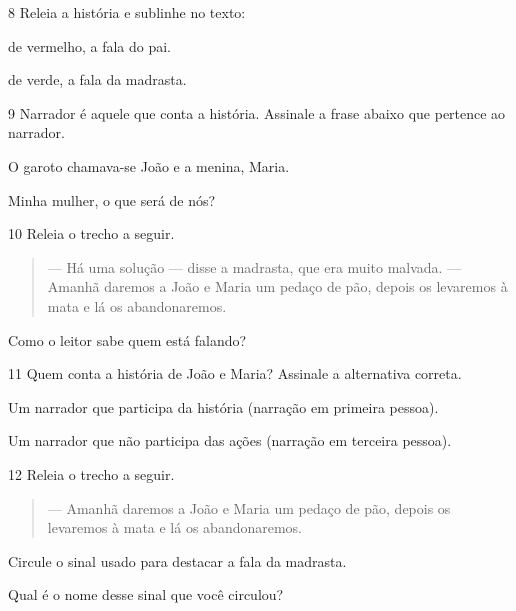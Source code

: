 \num{8} Releia a história e sublinhe no texto:

\begin{escolha}
\item de vermelho, a fala do pai.

\item de verde, a fala da madrasta.
\end{escolha}

\num{9} Narrador é aquele que conta a história. Assinale a frase abaixo que
pertence ao narrador.

\begin{escolha}
\boxitem[X] O garoto chamava-se João e a menina, Maria.

\boxitem[] Minha mulher, o que será de nós?
\end{escolha}

\num{10} Releia o trecho a seguir.

\begin{quote}
--- Há uma solução --- disse a madrasta, que era muito malvada.
--- Amanhã daremos a João e Maria um pedaço de pão, depois os levaremos
à mata e lá os abandonaremos.
\end{quote}

Como o leitor sabe quem está falando?


\num{11} Quem conta a história de João e Maria? Assinale a alternativa correta.


\begin{boxlist}
\boxitem[] Um narrador que participa da história (narração em primeira pessoa).

\boxitem[X] Um narrador que não participa das ações (narração em terceira pessoa).
\end{boxlist}

\num{12} Releia o trecho a seguir.

\begin{quote}
--- Amanhã daremos a João e Maria um pedaço de pão, depois os
levaremos à mata e lá os abandonaremos.
\end{quote}

\begin{escolha}
\item Circule o sinal usado para destacar a fala da madrasta.

\item Qual é o nome desse sinal que você circulou?

\end{escolha}


